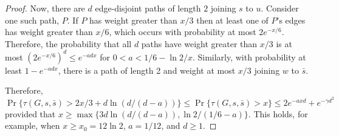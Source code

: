 \documentclass{patmorin}
\begin{document}
\begin{proof}
   Now, there are $d$ edge-disjoint paths of length $2$ joining $s$
   to $u$.  Consider one such path, $P$.  If $P$ has weight greater than
   $x/3$ then at least one of $P$'s edges has weight greater than $x/6$,
   which occurs with probability at most $2e^{-x/6}$.  Therefore,
   the probability that all $d$ paths have weight greater than $x/3$
   is at most $(2e^{-x/6})^d \le e^{-adx}$ for $0<a<1/6-\ln 2/x$.
   Similarly, with probability at least $1-e^{-adx}$, there is a path of
   length 2 and weight at most $x/3$ joining $w$ to $\bar{s}$.

   Therefore, 
   \[
      \Pr\{\tau(G,s,\bar{s}) > 2x/3 + d\ln(d/(d-a))\} 
        \le \Pr\{\tau(G,s,\bar{s}) > x\}  
           \le 2e^{-axd}+e^{-\gamma d^2}
   \]
   provided that $x \ge\max\{3d\ln(d/(d-a)),\ln 2/(1/6-a)\}$. This holds, 
   for example, when $x\ge x_0 = 12\ln 2$, $a=1/12$, and $d\ge 1$.
\end{proof}
\end{document}
